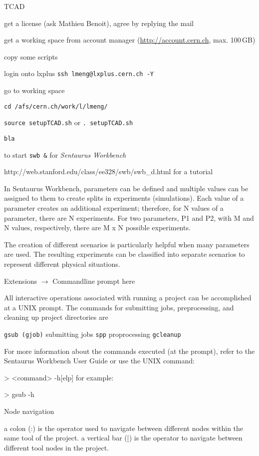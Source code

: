 TCAD

get a license (ask Mathieu Benoit), agree by replying the mail

get a working space from account manager (\url{http://account.cern.ch}, max. 100\,GB)

copy some scripts 

login onto lxplus \lstinline|ssh lmeng@lxplus.cern.ch -Y|

go to working space

\lstinline|cd /afs/cern.ch/work/l/lmeng/|

\lstinline|source setupTCAD.sh| or \lstinline|. setupTCAD.sh|

\begin{lstlisting}
bla

\end{lstlisting}

to start \lstinline|swb &| for \emph{Sentaurus Workbench}

http://web.stanford.edu/class/ee328/swb/swb\_d.html for a tutorial

In Sentaurus Workbench, parameters can be defined and multiple values can be assigned to them to create splits in experiments (simulations). Each value of a parameter creates an additional experiment; therefore, for N values of a parameter, there are N experiments. For two parameters, P1 and P2, with M and N values, respectively, there are M x N possible experiments.

The creation of different scenarios is particularly helpful when many parameters are used. The resulting experiments can be classified into separate scenarios to represent different physical situations.

Extensions $\rightarrow$ Commandline prompt here

All interactive operations associated with running a project can be accomplished at a UNIX prompt. The commands for submitting jobs, preprocessing, and cleaning up project directories are 

\lstinline|gsub (gjob)| submitting jobs
\lstinline|spp| proprocessing
\lstinline|gcleanup|


For more information about the commands executed (at the prompt), refer to the Sentaurus Workbench User Guide or use the UNIX command:

> <command> -h[elp]
for example:

> gsub -h


Node navigation

 a colon (:) is the operator used to navigate between different nodes within the same tool of the project.
 a vertical bar (|) is the operator to navigate between different tool nodes in the project.




